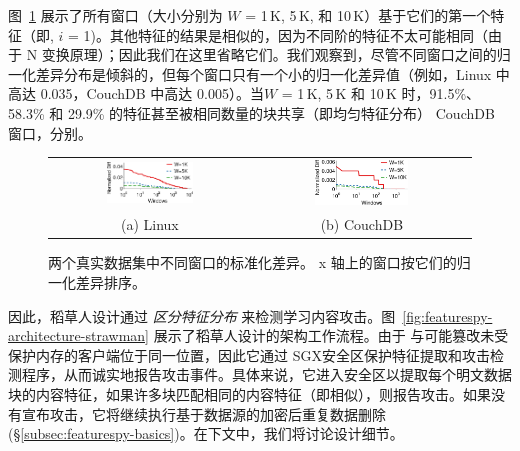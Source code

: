 图~\ref{fig:featurespy-featureDistribution} 展示了所有窗口（大小分别为 $W$ = 1\,K, 5\,K, 和 10\,K）基于它们的第一个特征（即, $i$ = 1)。其他特征的结果是相似的，因为不同阶的特征不太可能相同（由于 N 变换原理）；因此我们在这里省略它们。我们观察到，尽管不同窗口之间的归一化差异分布是倾斜的，但每个窗口只有一个小的归一化差异值（例如，Linux 中高达 0.035，CouchDB 中高达 0.005）。当$W$ = 1\,K, 5\,K 和 10\,K 时，91.5\%、58.3\% 和 29.9\% 的特征甚至被相同数量的块共享（即均匀特征分布） CouchDB 窗口，分别。

\begin{figure}
  \centering
  \begin{tabular}{cc}
    \includegraphics[width=0.45\textwidth]{pic/featurespy/plot/featureDistribution/featureDistributionLinux.pdf} &
    \includegraphics[width=0.45\textwidth]{pic/featurespy/plot/featureDistribution/featureDistributionCouchbase.pdf} \\
    {\small (a) Linux} & {\small (b) CouchDB} \\
    \end{tabular}
  \vspace{-6pt}
  \caption{两个真实数据集中不同窗口的标准化差异。 x 轴上的窗口按它们的归一化差异排序。}
  \label{fig:featurespy-featureDistribution}
  \vspace{-6pt}
\end{figure}

因此，稻草人设计通过 {\em 区分特征分布} 来检测学习内容攻击。图~\ref{fig:featurespy-architecture-strawman} 展示了稻草人设计的架构工作流程。由于 \sysnameF 与可能篡改未受保护内存的客户端位于同一位置，因此它通过 SGX安全区保护特征提取和攻击检测程序，从而诚实地报告攻击事件。具体来说，它进入安全区以提取每个明文数据块的内容特征，如果许多块匹配相同的内容特征（即相似），则报告攻击。如果没有宣布攻击，它将继续执行基于数据源的加密后重复数据删除 (\S\ref{subsec:featurespy-basics})。在下文中，我们将讨论设计细节。


